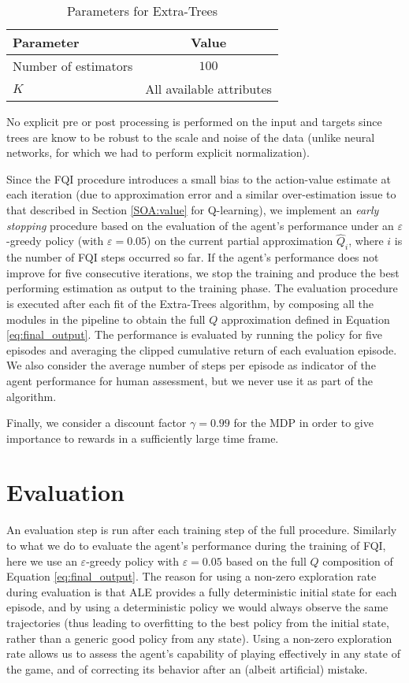 %
\begin{table}[h]
    \centering
    \begin{tabular}{l c} 
	\hline
	Parameter & Value \\ 
	\hline 
	Number of estimators & $100$ \\
	$K$ &  All available attributes \\
	\hline
    \end{tabular}
    \caption{Parameters for Extra-Trees}
    \label{t:extra_params}
\end{table}
%

No explicit pre or post processing is performed on the input and targets since
trees are know to be robust to the scale and noise of the data (unlike neural
networks, for which we had to perform explicit normalization). 

Since the FQI procedure introduces a small bias to the action-value estimate at 
each iteration (due to approximation error and a similar over-estimation issue 
to that described in Section \ref{SOA:value} for Q-learning), we implement an 
\textit{early stopping} procedure based on the evaluation of the agent's 
performance under an $\varepsilon$-greedy policy (with $\varepsilon = 0.05$) on 
the current partial approximation $\hat{Q}_i$, where $i$ is the number of FQI 
steps occurred so far. If the agent's performance does not improve for five 
consecutive iterations, we stop the training and produce the best performing 
estimation as output to the training phase.
The evaluation procedure is executed after each fit of the Extra-Trees
algorithm, by composing all the modules in the pipeline to obtain the full $Q$ 
approximation defined in Equation \eqref{eq:final_output}. 
The performance is evaluated by running the policy for five episodes and 
averaging the clipped cumulative return of each evaluation episode. 
We also consider the average number of steps per episode as indicator of the 
agent performance for human assessment, but we never use it as part of the 
algorithm. 

Finally, we consider a discount factor $\gamma = 0.99$ for the MDP in order to 
give importance to rewards in a sufficiently large time frame. 

\section{Evaluation}
An evaluation step is run after each training step of the full procedure.
Similarly to what we do to evaluate the agent's performance during the training
of FQI, here we use an $\varepsilon$-greedy policy with $\varepsilon = 0.05$ 
based on the full $Q$ composition of Equation \eqref{eq:final_output}.
The reason for using a non-zero exploration rate during evaluation is that ALE
provides a fully deterministic initial state for each episode, and by using a 
deterministic policy we would always observe the same trajectories (thus leading
to overfitting to the best policy from the initial state, rather than a generic
good policy from any state). Using a non-zero exploration rate allows us to 
assess the agent's capability of playing effectively in any state of the game, 
and of correcting its behavior after an (albeit artificial) mistake.

